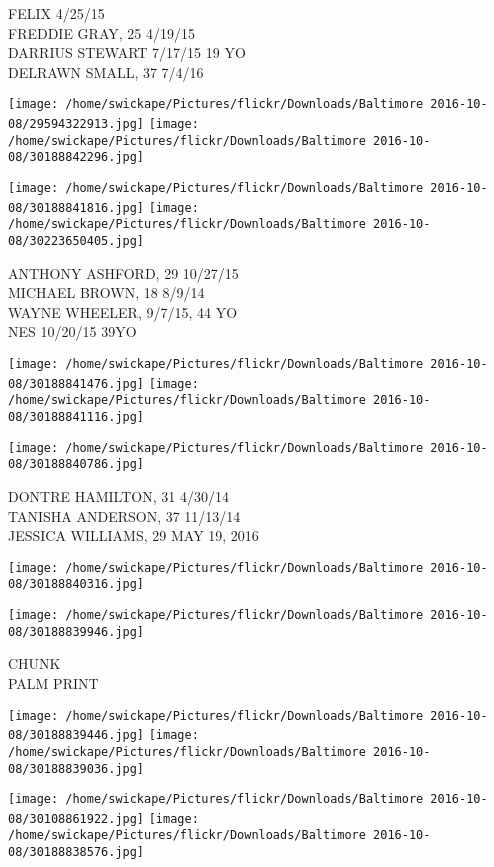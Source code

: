 \documentclass[10pt,letterpaper]{article}
\begin{document}
FELIX 4/25/15\\
FREDDIE GRAY, 25 4/19/15\\
DARRIUS STEWART 7/17/15 19 YO\\
DELRAWN SMALL, 37 7/4/16
\pagebreak

\texttt{[image: /home/swickape/Pictures/flickr/Downloads/Baltimore 2016-10-08/29594322913.jpg]}
\texttt{[image: /home/swickape/Pictures/flickr/Downloads/Baltimore 2016-10-08/30188842296.jpg]}

\texttt{[image: /home/swickape/Pictures/flickr/Downloads/Baltimore 2016-10-08/30188841816.jpg]}
\texttt{[image: /home/swickape/Pictures/flickr/Downloads/Baltimore 2016-10-08/30223650405.jpg]}

ANTHONY ASHFORD, 29 10/27/15\\
MICHAEL BROWN, 18 8/9/14\\
WAYNE WHEELER, 9/7/15, 44 YO\\
NES 10/20/15 39YO
\pagebreak

\texttt{[image: /home/swickape/Pictures/flickr/Downloads/Baltimore 2016-10-08/30188841476.jpg]}
\texttt{[image: /home/swickape/Pictures/flickr/Downloads/Baltimore 2016-10-08/30188841116.jpg]}

\texttt{[image: /home/swickape/Pictures/flickr/Downloads/Baltimore 2016-10-08/30188840786.jpg]}

DONTRE HAMILTON, 31 4/30/14\\
TANISHA ANDERSON, 37 11/13/14\\
JESSICA WILLIAMS, 29 MAY 19, 2016
\pagebreak

\texttt{[image: /home/swickape/Pictures/flickr/Downloads/Baltimore 2016-10-08/30188840316.jpg]}

\vspace{0.25in}
\texttt{[image: /home/swickape/Pictures/flickr/Downloads/Baltimore 2016-10-08/30188839946.jpg]}

CHUNK\\
PALM PRINT
\pagebreak

\texttt{[image: /home/swickape/Pictures/flickr/Downloads/Baltimore 2016-10-08/30188839446.jpg]}
\texttt{[image: /home/swickape/Pictures/flickr/Downloads/Baltimore 2016-10-08/30188839036.jpg]}

\texttt{[image: /home/swickape/Pictures/flickr/Downloads/Baltimore 2016-10-08/30108861922.jpg]}
\texttt{[image: /home/swickape/Pictures/flickr/Downloads/Baltimore 2016-10-08/30188838576.jpg]}
\end{document}
